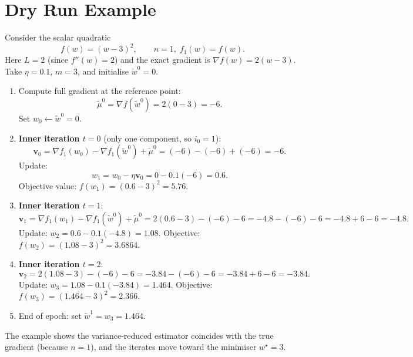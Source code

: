 \documentclass{article}
\begin{document}
\section*{Dry Run Example}
Consider the scalar quadratic
\[
f(w)=(w-3)^2,\qquad n=1,\; f_1(w)=f(w).
\]
Here $L=2$ (since $f''(w)=2$) and the exact gradient is $\nabla f(w)=2(w-3)$.
Take $\eta=0.1$, $m=3$, and initialise $\tilde{w}^{0}=0$.

\begin{enumerate}[label=Step \arabic*:, leftmargin=*]
\item Compute full gradient at the reference point:
\[
\tilde{\mu}^{0}= \nabla f(\tilde{w}^{0}) =2(0-3)=-6.
\]
Set $w_0\gets \tilde{w}^{0}=0$.

\item \textbf{Inner iteration $t=0$} (only one component, so $i_0=1$):
\[
\mathbf{v}_0 = \nabla f_{1}(w_0)-\nabla f_{1}(\tilde{w}^{0})+\tilde{\mu}^{0}
            = (-6)-(-6)+(-6) = -6.
\]
Update:
\[
w_{1}= w_{0}-\eta \mathbf{v}_0 = 0-0.1(-6)=0.6.
\]
Objective value:
\(f(w_1)=(0.6-3)^2=5.76.\)

\item \textbf{Inner iteration $t=1$}:
\[
\mathbf{v}_1 = \nabla f_{1}(w_1)-\nabla f_{1}(\tilde{w}^{0})+\tilde{\mu}^{0}
            = 2(0.6-3)-(-6)-6 = -4.8-(-6)-6 = -4.8+6-6 = -4.8.
\]
Update:
\(w_{2}=0.6-0.1(-4.8)=1.08.\)
Objective:
\(f(w_2)=(1.08-3)^2=3.6864.\)

\item \textbf{Inner iteration $t=2$}:
\[
\mathbf{v}_2 = 2(1.08-3)-(-6)-6 = -3.84-(-6)-6 = -3.84+6-6 = -3.84.
\]
Update:
\(w_{3}=1.08-0.1(-3.84)=1.464.\)
Objective:
\(f(w_3)=(1.464-3)^2=2.366.\)

\item End of epoch: set $\tilde{w}^{1}=w_3=1.464$.
\end{enumerate}
The example shows the variance‑reduced estimator coincides with the true gradient (because $n=1$), and the iterates move toward the minimiser $w^\star=3$.

\newpage
\end{document}
